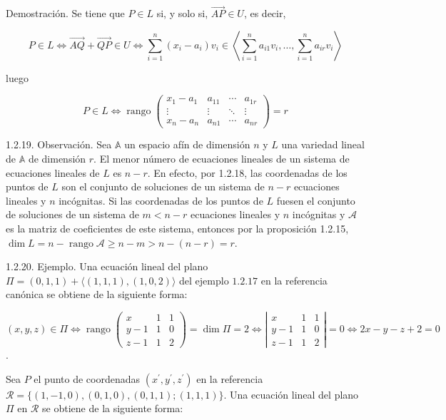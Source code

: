 \documentclass[12pt, a4paper, ones, notitlepage, openany,titlepage]{article}
\begin{document}
Demostración. Se tiene que $P \in L$ si, y solo si, $\overrightarrow{A P} \in U$, es decir,

$$
P \in L \Longleftrightarrow \overrightarrow{A Q}+\overrightarrow{Q P} \in U \Longleftrightarrow \sum_{i=1}^{n}\left(x_{i}-a_{i}\right) v_{i} \in\left\langle\sum_{i=1}^{n} a_{i 1} v_{i}, \ldots, \sum_{i=1}^{n} a_{i r} v_{i}\right\rangle
$$

luego

$$
P \in L \Longleftrightarrow \operatorname{rango}\left(\begin{array}{cccc}
x_{1}-a_{1} & a_{11} & \cdots & a_{1 r} \\
\vdots & \vdots & \ddots & \vdots \\
x_{n}-a_{n} & a_{n 1} & \cdots & a_{n r}
\end{array}\right)=r
$$

1.2.19. Observación. Sea $\mathbb{A}$ un espacio afín de dimensión $n$ y $L$ una variedad lineal de $\mathbb{A}$ de dimensión $r$. El menor número de ecuaciones lineales de un sistema de ecuaciones lineales de $L$ es $n-r$. En efecto, por 1.2.18, las coordenadas de los puntos de $L$ son el conjunto de soluciones de un sistema de $n-r$ ecuaciones lineales y $n$ incógnitas. Si las coordenadas de los puntos de $L$ fuesen el conjunto de soluciones de un sistema de $m<n-r$ ecuaciones lineales y $n$ incógnitas y $\mathcal{A}$ es la matriz de coeficientes de este sistema, entonces por la proposición 1.2.15, $\dim  L=n-\operatorname{rango} \mathcal{A} \geq n-m>n-(n-r)=r$.

1.2.20. Ejemplo. Una ecuación lineal del plano $\Pi=(0,1,1)+\langle(1,1,1),(1,0,2)\rangle$ del ejemplo $1.2 .17$ en la referencia canónica se obtiene de la siguiente forma:

$(x, y, z) \in \Pi \Longleftrightarrow \operatorname{rango}\left(\begin{array}{ccc}x & 1 & 1 \\ y-1 & 1 & 0 \\ z-1 & 1 & 2\end{array}\right)=\dim  \Pi=2 \Longleftrightarrow\left|\begin{array}{ccc}x & 1 & 1 \\ y-1 & 1 & 0 \\ z-1 & 1 & 2\end{array}\right|=0 \Longleftrightarrow 2 x-y-z+2=0$.

Sea $P$ el punto de coordenadas $\left(x^{\prime}, y^{\prime}, z^{\prime}\right)$ en la referencia $\mathcal{R}=\{(1,-1,0),(0,1,0),(0,1,1) ;(1,1,1)\}$. Una ecuación lineal del plano $\Pi$ en $\mathcal{R}$ se obtiene de la siguiente forma:
\end{document}
